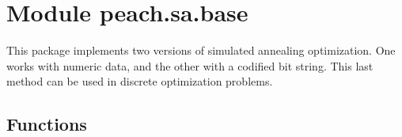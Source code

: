 %
%
%


\section{Module peach.sa.base}

    \label{peach:sa:base}

This package implements two versions of simulated annealing optimization. One
works with numeric data, and the other with a codified bit string. This last
method can be used in discrete optimization problems.


  \subsection{Functions}

    \label{peach:standard_normal}

    \vspace{0.5ex}

